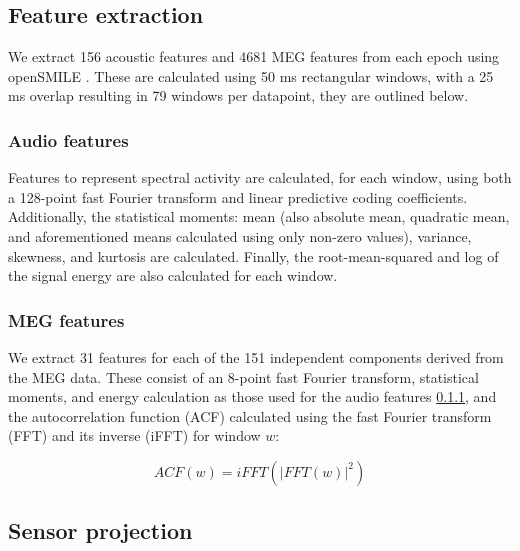 \documentclass[utf8]{frontiersSCNS} %
\begin{document}
\subsection{Feature extraction}

We extract 156 acoustic features and 4681 MEG features from each epoch using openSMILE \cite{Eyben13-RDI}. These are calculated using 50 ms rectangular windows, with a 25 ms overlap resulting in 79 windows per datapoint, they are outlined below.

\subsubsection{Audio features} \label{ssec:audio_features}

Features to represent spectral activity are calculated, for each window, using both a 128-point fast Fourier transform and linear predictive coding coefficients. Additionally, the statistical moments: mean (also absolute mean, quadratic mean, and aforementioned means calculated using only non-zero values), variance, skewness, and kurtosis are calculated. Finally, the root-mean-squared and log of the signal energy are also calculated for each window.

\subsubsection{MEG features}

We extract 31 features for each of the 151 independent components derived from the MEG data. These consist of an 8-point fast Fourier transform, statistical moments, and energy calculation as those used for the audio features \ref{ssec:audio_features}, and the autocorrelation function (ACF) calculated using the fast Fourier transform (FFT) and its inverse (iFFT) for window $w$:


\begin{equation}
  ACF(w) = iFFT(|FFT(w)|^2)
  \label{eq1}
\end{equation}

\subsection{Sensor projection}\label{sec:sens_proj}
\end{document}
